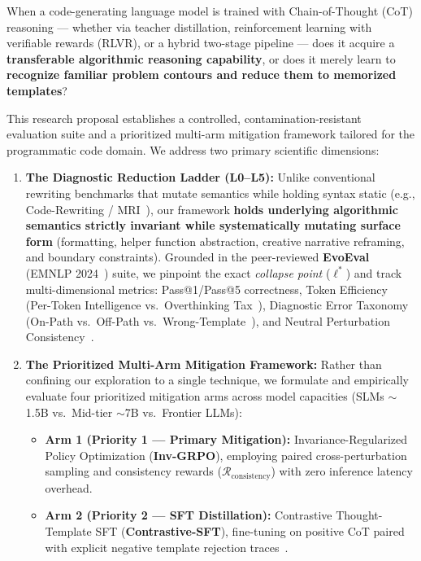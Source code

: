 \documentclass[12pt, a4paper]{article}
\begin{document}
\newpage
\begin{researchbox}[title={Executive Abstract}]
When a code-generating language model is trained with Chain-of-Thought (CoT) reasoning --- whether via teacher distillation, reinforcement learning with verifiable rewards (RLVR), or a hybrid two-stage pipeline --- does it acquire a \textbf{transferable algorithmic reasoning capability}, or does it merely learn to \textbf{recognize familiar problem contours and reduce them to memorized templates}?

This research proposal establishes a controlled, contamination-resistant evaluation suite and a prioritized multi-arm mitigation framework tailored for the programmatic code domain. We address two primary scientific dimensions:
\begin{enumerate}[leftmargin=1.5em]
  \item \textbf{The Diagnostic Reduction Ladder (L0--L5):} Unlike conventional rewriting benchmarks that mutate semantics while holding syntax static (e.g., Code-Rewriting / MRI~\cite{memorize_or_generalize}), our framework \textbf{holds underlying algorithmic semantics strictly invariant while systematically mutating surface form} (formatting, helper function abstraction, creative narrative reframing, and boundary constraints). Grounded in the peer-reviewed \textbf{EvoEval} (EMNLP 2024~\cite{evoeval}) suite, we pinpoint the exact \emph{collapse point} ($\ell^*$) and track multi-dimensional metrics: Pass@1/Pass@5 correctness, Token Efficiency (Per-Token Intelligence vs.\ Overthinking Tax~\cite{ockbench, thinking_longer}), Diagnostic Error Taxonomy (On-Path vs.\ Off-Path vs.\ Wrong-Template~\cite{depth_ceiling}), and Neutral Perturbation Consistency~\cite{flip_flop_consistency}.
  \item \textbf{The Prioritized Multi-Arm Mitigation Framework:} Rather than confining our exploration to a single technique, we formulate and empirically evaluate four prioritized mitigation arms across model capacities (SLMs $\sim$1.5B vs.\ Mid-tier $\sim$7B vs.\ Frontier LLMs):
  \begin{itemize}
    \item \textbf{Arm 1 (Priority 1 --- Primary Mitigation):} Invariance-Regularized Policy Optimization (\textbf{Inv-GRPO}), employing paired cross-perturbation sampling and consistency rewards ($\mathcal{R}_{\text{consistency}}$) with zero inference latency overhead.
    \item \textbf{Arm 2 (Priority 2 --- SFT Distillation):} Contrastive Thought-Template SFT (\textbf{Contrastive-SFT}), fine-tuning on positive CoT paired with explicit negative template rejection traces~\cite{supercorrect, recode_contrastive}.

\end{itemize}
\end{enumerate}
\end{researchbox}
\end{document}
